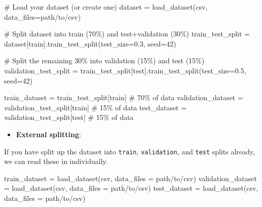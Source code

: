 \documentclass[
  letterpaper,
  DIV=11,
  numbers=noendperiod]{scrreprt}
\newenvironment{Shaded}{\begin{snugshade}}{\end{snugshade}}
\newcommand{\CommentTok}[1]{\textcolor[rgb]{0.37,0.37,0.37}{#1}}
\newcommand{\DecValTok}[1]{\textcolor[rgb]{0.68,0.00,0.00}{#1}}
\newcommand{\FloatTok}[1]{\textcolor[rgb]{0.68,0.00,0.00}{#1}}
\newcommand{\NormalTok}[1]{\textcolor[rgb]{0.00,0.23,0.31}{#1}}
\newcommand{\OperatorTok}[1]{\textcolor[rgb]{0.37,0.37,0.37}{#1}}
\newcommand{\StringTok}[1]{\textcolor[rgb]{0.13,0.47,0.30}{#1}}
\providecommand{\tightlist}{%
  \setlength{\itemsep}{0pt}\setlength{\parskip}{0pt}}\usepackage{longtable,booktabs,array}
\begin{document}
\begin{Shaded}
\begin{Highlighting}[]
\CommentTok{\# Load your dataset (or create one)}
\NormalTok{dataset }\OperatorTok{=}\NormalTok{ load\_dataset(}\StringTok{\textquotesingle{}csv\textquotesingle{}}\NormalTok{, data\_files}\OperatorTok{=}\NormalTok{path}\OperatorTok{/}\NormalTok{to}\OperatorTok{/}\NormalTok{csv)}

\CommentTok{\# Split dataset into train (70\%) and test+validation (30\%)}
\NormalTok{train\_test\_split }\OperatorTok{=}\NormalTok{ dataset[}\StringTok{\textquotesingle{}train\textquotesingle{}}\NormalTok{].train\_test\_split(test\_size}\OperatorTok{=}\FloatTok{0.3}\NormalTok{, seed}\OperatorTok{=}\DecValTok{42}\NormalTok{)}

\CommentTok{\# Split the remaining 30\% into validation (15\%) and test (15\%)}
\NormalTok{validation\_test\_split }\OperatorTok{=}\NormalTok{ train\_test\_split[}\StringTok{\textquotesingle{}test\textquotesingle{}}\NormalTok{].train\_test\_split(test\_size}\OperatorTok{=}\FloatTok{0.5}\NormalTok{, seed}\OperatorTok{=}\DecValTok{42}\NormalTok{)}

\NormalTok{train\_dataset }\OperatorTok{=}\NormalTok{ train\_test\_split[}\StringTok{\textquotesingle{}train\textquotesingle{}}\NormalTok{] }\CommentTok{\# 70\% of data}
\NormalTok{validation\_dataset }\OperatorTok{=}\NormalTok{ validation\_test\_split[}\StringTok{\textquotesingle{}train\textquotesingle{}}\NormalTok{] }\CommentTok{\# 15\% of data}
\NormalTok{test\_dataset }\OperatorTok{=}\NormalTok{ validation\_test\_split[}\StringTok{\textquotesingle{}test\textquotesingle{}}\NormalTok{] }\CommentTok{\# 15\% of data}
\end{Highlighting}
\end{Shaded}

\begin{itemize}
\tightlist
\item
  \textbf{External splitting}:
\end{itemize}

If you have split up the dataset into \texttt{train},
\texttt{validation}, and \texttt{test} splits already, we can read these
in individually.

\begin{Shaded}
\begin{Highlighting}[]
\NormalTok{train\_dataset }\OperatorTok{=}\NormalTok{ load\_dataset(}\StringTok{\textquotesingle{}csv\textquotesingle{}}\NormalTok{, data\_files }\OperatorTok{=}\NormalTok{ path}\OperatorTok{/}\NormalTok{to}\OperatorTok{/}\NormalTok{csv)}
\NormalTok{validation\_dataset }\OperatorTok{=}\NormalTok{ load\_dataset(}\StringTok{\textquotesingle{}csv\textquotesingle{}}\NormalTok{, data\_files }\OperatorTok{=}\NormalTok{ path}\OperatorTok{/}\NormalTok{to}\OperatorTok{/}\NormalTok{csv)}
\NormalTok{test\_dataset }\OperatorTok{=}\NormalTok{ load\_dataset(}\StringTok{\textquotesingle{}csv\textquotesingle{}}\NormalTok{, data\_files }\OperatorTok{=}\NormalTok{ path}\OperatorTok{/}\NormalTok{to}\OperatorTok{/}\NormalTok{csv)}
\end{Highlighting}
\end{Shaded}
\end{document}
